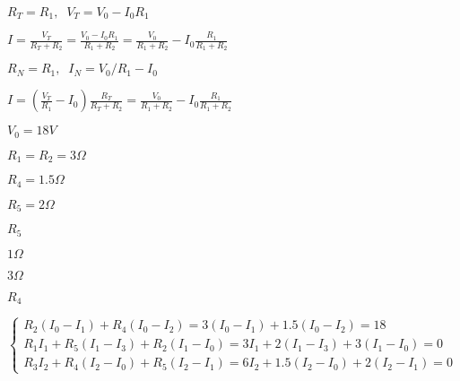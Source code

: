\documentclass{article}
\def\lthtmlcheckvsize{\ifdim\ht\sizebox<\vsize 
  \ifdim\wd\sizebox<\hsize\expandafter\hfill\fi \expandafter\vfill
  \else\expandafter\vss\fi}%
\begin{document}
{\newpage\clearpage
{}%
$ R_T=R_1,\;\;V_T=V_0-I_0R_1$%
\lthtmlindisplaymathZ
\lthtmlcheckvsize\clearpage}

{\newpage\clearpage
{}%
$\displaystyle I=\frac{V_T}{R_T+R_2}=\frac{V_0-I_0R_1}{R_1+R_2}
=\frac{V_0}{R_1+R_2}-I_0\frac{R_1}{R_1+R_2}$%
\lthtmlindisplaymathZ
\lthtmlcheckvsize\clearpage}

{\newpage\clearpage
{}%
$ R_N=R_1,\;\;I_N=V_0/R_1-I_0$%
\lthtmlindisplaymathZ
\lthtmlcheckvsize\clearpage}

{\newpage\clearpage
{}%
$\displaystyle I=\left(\frac{V_T}{R_1}-I_0\right)\frac{R_T}{R_T+R_2}
=\frac{V_0}{R_1+R_2}-I_0\frac{R_1}{R_1+R_2}$%
\lthtmlindisplaymathZ
\lthtmlcheckvsize\clearpage}

{\newpage\clearpage
{}%
$ V_0=18V$%
\lthtmlindisplaymathZ
\lthtmlcheckvsize\clearpage}

{\newpage\clearpage
{}%
$ R_1=R_2=3\Omega$%
\lthtmlindisplaymathZ
\lthtmlcheckvsize\clearpage}

{\newpage\clearpage
{}%
$ R_4=1.5\Omega$%
\lthtmlindisplaymathZ
\lthtmlcheckvsize\clearpage}

{\newpage\clearpage
{}%
$ R_5=2\Omega$%
\lthtmlindisplaymathZ
\lthtmlcheckvsize\clearpage}

{\newpage\clearpage
{}%
$ R_5$%
\lthtmlindisplaymathZ
\lthtmlcheckvsize\clearpage}

{\newpage\clearpage
{}%
$ 1\Omega$%
\lthtmlindisplaymathZ
\lthtmlcheckvsize\clearpage}

{\newpage\clearpage
{}%
$ 3\Omega$%
\lthtmlindisplaymathZ
\lthtmlcheckvsize\clearpage}

{\newpage\clearpage
{}%
$ R_4$%
\lthtmlindisplaymathZ
\lthtmlcheckvsize\clearpage}

{\newpage\clearpage
{}%
$\displaystyle \left\{\begin{array}{l}
R_2(I_0-I_1)+R_4(I_0-I_2)=3(I_0-I_1)+1.5(I_0-I_2)=18\\
R_1I_1+R_5(I_1-I_3)+R_2(I_1-I_0)=3I_1+2(I_1-I_3)+3(I_1-I_0)=0\\
R_3I_2+R_4(I_2-I_0)+R_5(I_2-I_1)=6I_2+1.5(I_2-I_0)+2(I_2-I_1)
=0\end{array}\right.$%
\lthtmlindisplaymathZ
\lthtmlcheckvsize\clearpage}
\end{document}
